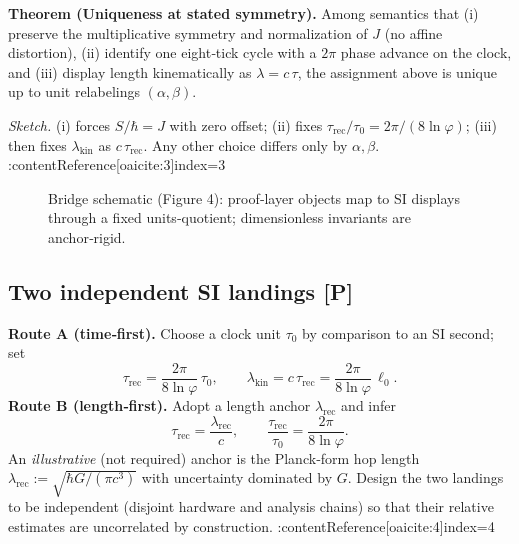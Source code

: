\documentclass[11pt]{article}
\begin{document}
\medskip
\noindent\textbf{Theorem (Uniqueness at stated symmetry).}
Among semantics that (i) preserve the multiplicative symmetry and normalization of \(J\) (no affine distortion), (ii) identify one eight‑tick cycle with a \(2\pi\) phase advance on the clock, and (iii) display length kinematically as \(\lambda=c\,\tau\), the assignment above is unique up to unit relabelings \((\alpha,\beta)\).

\emph{Sketch.} (i) forces \(S/\hbar=J\) with zero offset; (ii) fixes \(\tau_{\mathrm{rec}}/\tau_{0}=2\pi/(8\ln\varphi)\); (iii) then fixes \(\lambda_{\mathrm{kin}}\) as \(c\,\tau_{\mathrm{rec}}\). Any other choice differs only by \(\alpha,\beta\). :contentReference[oaicite:3]{index=3}

\begin{figure}[h]
  \centering
  \caption{Bridge schematic (Figure 4): proof‑layer objects map to SI displays through a fixed units‑quotient; dimensionless invariants are anchor‑rigid.}
\end{figure}

\subsection*{Two independent SI landings [P]}
\textbf{Route A (time‑first).}
Choose a clock unit \(\tau_{0}\) by comparison to an SI second; set
\[
\tau_{\mathrm{rec}}=\frac{2\pi}{8\ln\varphi}\,\tau_{0},\qquad
\lambda_{\mathrm{kin}}=c\,\tau_{\mathrm{rec}}=\frac{2\pi}{8\ln\varphi}\,\ell_{0}.
\]
\textbf{Route B (length‑first).}
Adopt a length anchor \(\lambda_{\mathrm{rec}}\) and infer
\[
\tau_{\mathrm{rec}}=\frac{\lambda_{\mathrm{rec}}}{c},
\qquad
\frac{\tau_{\mathrm{rec}}}{\tau_{0}}=\frac{2\pi}{8\ln\varphi}.
\]
An \emph{illustrative} (not required) anchor is the Planck‑form hop length
\(\lambda_{\mathrm{rec}}:=\sqrt{\hbar G/(\pi c^{3})}\) with uncertainty dominated by \(G\). Design the two landings to be independent (disjoint hardware and analysis chains) so that their relative estimates are uncorrelated by construction. :contentReference[oaicite:4]{index=4}
\end{document}
